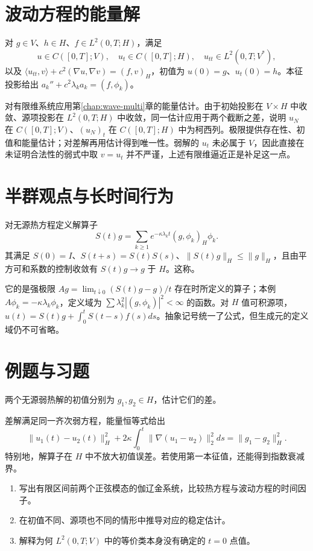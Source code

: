 \documentclass[UTF8,12pt,a4paper,fontset=fandol]{ctexbook}
\begin{document}
\section{波动方程的能量解}
对 $g\in V$、$h\in H$、$f\in L^2(0,T;H)$，满足
\[
 u\in C([0,T];V),\quad u_t\in C([0,T];H),\quad u_{tt}\in L^2(0,T;V^*),
\]
以及 $\langle u_{tt},v\rangle+c^2(\nabla u,\nabla v)=(f,v)_H$，初值为 $u(0)=g$、$u_t(0)=h$。本征投影给出 $a_k''+c^2\lambda_ka_k=(f,\phi_k)$。

对有限维系统应用第\ref{chap:wave-multi}章的能量估计。由于初始投影在 $V\times H$ 中收敛、源项投影在 $L^2(0,T;H)$ 中收敛，同一估计应用于两个截断之差，说明 $u_N$ 在 $C([0,T];V)$、$(u_N)_t$ 在 $C([0,T];H)$ 中为柯西列。极限提供存在性、初值和能量估计；对差解再用估计得到唯一性。弱解的 $u_t$ 未必属于 $V$，因此直接在未证明合法性的弱式中取 $v=u_t$ 并不严谨，上述有限维逼近正是补足这一点。

\section{半群观点与长时间行为}
对无源热方程定义解算子
\[
 S(t)g=\sum_{k\ge1}e^{-\kappa\lambda_kt}(g,\phi_k)_H\phi_k.
\]
其满足 $S(0)=I$、$S(t+s)=S(t)S(s)$、$\|S(t)g\|_H\le\|g\|_H$，且由平方可和系数的控制收敛有 $S(t)g\to g$ 于 $H$。这称。

它的是强极限 $Ag=\lim_{t\downarrow0}(S(t)g-g)/t$ 存在时所定义的算子；本例 $A\phi_k=-\kappa\lambda_k\phi_k$，定义域为 $\sum\lambda_k^2|(g,\phi_k)|^2<\infty$ 的函数。对 $H$ 值可积源项，$u(t)=S(t)g+\int_0^tS(t-s)f(s)ds$。抽象记号统一了公式，但生成元的定义域仍不可省略。

\section{例题与习题}
\begin{example}
两个无源弱热解的初值分别为 $g_1,g_2\in H$，估计它们的差。
\end{example}
\begin{solve}
差解满足同一齐次弱方程，能量恒等式给出
\[
 \|u_1(t)-u_2(t)\|_H^2+
 2\kappa\int_0^t\|\nabla(u_1-u_2)\|_2^2ds=\|g_1-g_2\|_H^2.
\]
特别地，解算子在 $H$ 中不放大初值误差。若使用第一本征值，还能得到指数衰减界。
\end{solve}
\begin{enumerate}
 \item 写出有限区间前两个正弦模态的伽辽金系统，比较热方程与波动方程的时间因子。
 \item 在初值不同、源项也不同的情形中推导对应的稳定估计。
 \item 解释为何 $L^2(0,T;V)$ 中的等价类本身没有确定的 $t=0$ 点值。
\end{enumerate}
\end{document}
